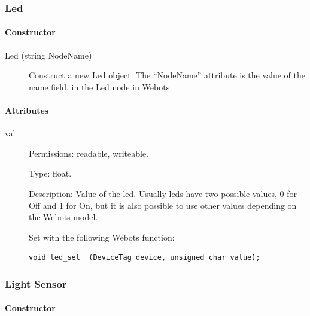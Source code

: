 \subsubsection{Led}
\label{webots.uobjects.robotdevices.led}%

\paragraph{Constructor}
\label{webots.uobjects.robotdevices.led.constructor}%

\noindent
\begin{description}
\item[{Led (string NodeName)}] Construct a new Led object. The ``NodeName'' attribute is the value
          of the name field, in the Led node in Webots

\end{description}

\paragraph{Attributes}
\label{webots.uobjects.robotdevices.led.attributes}%

\noindent
\begin{description}
\item[{         val
 }]            Permissions: readable, writeable.


 Type: float.


 Description: Value of the led. Usually leds have two possible values,
 0 for Off and 1 for On, but it is also possible to use other values
 depending on the Webots model.


          Set with the following Webots function:


\begin{lstlisting}
void led_set  (DeviceTag device, unsigned char value);
\end{lstlisting}
\end{description}

\subsubsection{Light Sensor}
\label{webots.uobjects.robotdevices.lightsensor}%

\paragraph{Constructor}
\label{webots.uobjects.robotdevices.lightsensor.constructor}%

